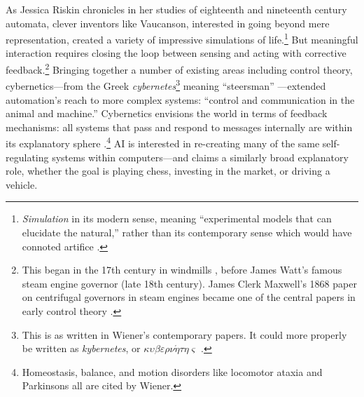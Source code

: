 

As Jessica Riskin chronicles in her studies of eighteenth and
nineteenth century automata, clever inventors like Vaucanson, interested in going
beyond mere representation, created a variety of impressive
simulations of life.\footnote{\emph{Simulation} in its modern sense, meaning
``experimental models that can elucidate the natural,'' rather than its
contemporary sense which would have connoted artifice \cite[p.
  605--606]{riskinDuck}.} But meaningful interaction requires closing the loop between
sensing and acting with corrective feedback.\footnote{This began in
  the 17th century in windmills \cite{richardhills}, before James
  Watt's famous steam engine governor
(late 18th century). James Clerk Maxwell's 1868 paper on centrifugal
 governors in steam engines became one of the central papers in early
 control theory \cite{ottomayr}.} Bringing together a number of existing
 areas including control theory,
 cybernetics---from the Greek \emph{cybernetes}\footnote{This is as
   written in Wiener's contemporary papers. It could more properly be written
   as \emph{kybernetes}, or 
   $\kappa\upsilon\beta\varepsilon\rho\nu\acute{\eta}\tau\eta\varsigma$
   \cite[p. 11]{cybernetics}.} meaning 
 ``steersman'' \cite[p. 6]{wienerMainIdeas}---extended automation's reach to more complex
 systems: ``control and communication in the animal and machine.''
 Cybernetics envisions the world in 
 terms of feedback mechanisms: all systems that pass and respond to
 messages internally are within its explanatory sphere \cite[p.
   10-15]{wienerMainIdeas}.\footnote{Homeostasis, balance, and motion
 disorders like locomotor ataxia and Parkinsons all are cited by Wiener.}
 AI is interested in re-creating many of the same
 self-regulating systems within computers---and claims a
 similarly broad explanatory role, whether the goal is playing chess,
 investing in the market, or driving a vehicle. 


